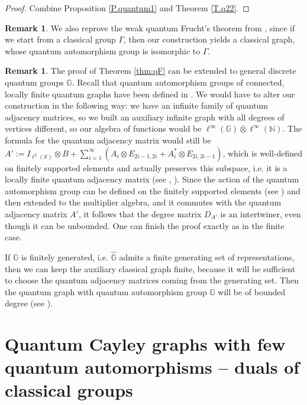 \documentclass[12pt]{amsart}
\theoremstyle{definition}
\theoremstyle{definition}
\theoremstyle{definition}
\theoremstyle{definition}
\newtheorem{remark}[thm]{Remark}
\newcommand{\I}{{I}}
\newcommand{\G}{\mathbb{G}}
\newcommand{\X}{\mathbb{X}}
\numberwithin{equation}{section}
\begin{document}
\begin{proof} Combine Proposition \ref{P.quantum1} and 
Theorem \ref{T.q22}.
\end{proof}
\begin{remark}
We also reprove the weak quantum Frucht's theorem from \cite{DBRS24}, since if we start from a classical group $\Gamma$, then our construction yields a classical graph, whose quantum automorphism group is isomorphic to $\Gamma$.
\end{remark}
\begin{remark}
The proof of Theorem \ref{thm:qF} can be extended to general discrete quantum groups $\G$. Recall that quantum automorphism groups of connected, locally finite quantum graphs have been defined in \cite{Rol25}. We would have to alter our construction in the following way: we have an infinite family of quantum adjacency matrices, so we built an auxiliary infinite graph with all degrees of vertices different, so our algebra of functions would be $\ell^{\infty}(\G) \overline{\otimes} \ell^{\infty}(\mathbb{N})$. The formula for the quantum adjacency matrix would still be $A':=\I_{\ell^2(\X)}\otimes B+\sum_{i=1}^{\infty} (A_i\otimes E_{2i-1,2i}+A_i^*\otimes E_{2i,2i-1})$, which is well-defined on finitely supported elements and actually preserves this subspace, i.e. it is a locally finite quantum adjacency matrix (see \cite[Definition 3.24]{Was24}, \cite[Definition 4.1.1]{Rol25}). Since the action of the quantum automorphism group can be defined on the finitely supported elements (see \cite[Proposition 3.3.15]{Rol25}) and then extended to the multiplier algebra, and it commutes with the quantum adjacency matrix $A'$, it follows that the degree matrix $D_{A'}$ is an intertwiner, even though it can be unbounded. One can finish the proof exactly as in the finite case.

If $\G$ is finitely generated, i.e. $\widehat{\G}$ admits a finite generating set of representations, then we can keep the auxiliary classical graph finite, because it will be sufficient to choose the quantum adjacency matrices coming from the generating set. Then the quantum graph with quantum automorphism group $\G$ will be of bounded degree (see \cite[Definition 3.22]{Was24}).
\end{remark}

\section{Quantum Cayley graphs with few quantum automorphisms -- duals of classical groups} \label{sec:rigid-calyey}
\end{document}
